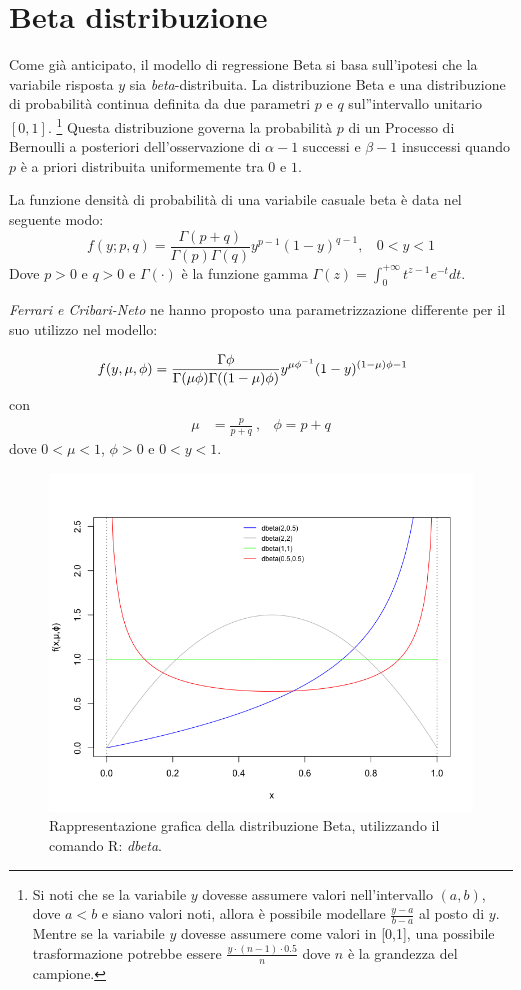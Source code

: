 \documentclass[twoside,twocolumn]{article}
\begin{document}
	\section{Beta distribuzione}
	Come già anticipato, il modello di regressione Beta si basa sull'ipotesi che la variabile risposta $y$ sia \textit{beta}-distribuita.
	La distribuzione Beta e una distribuzione di probabilità continua definita da due parametri $p$ e $q$ sul''intervallo unitario $[0,1]$. \footnote{Si noti che se la variabile $y$ dovesse assumere valori nell'intervallo $(a,b)$, dove $a < b$ e siano valori noti, allora è possibile modellare $\frac{y-a}{b-a}$ al posto di $y$. Mentre se la variabile $y$ dovesse assumere come valori in [0,1], una possibile trasformazione potrebbe essere $\frac{y\cdot (n-1) \cdot 0.5}{n}$ dove $n$ è la grandezza del campione.} Questa distribuzione governa la probabilità $p$ di un Processo di Bernoulli a posteriori dell'osservazione di $\alpha -1$ successi e $\beta -1$ insuccessi quando $p$  è a priori distribuita uniformemente tra $0$ e $1$. 
	
	La funzione densità di probabilità di una variabile casuale beta è data nel seguente modo:
	$$f(y;p,q)=\frac{\Gamma(p+q)}{\Gamma(p)\Gamma(q)}y^{p-1}(1-y)^{q-1},\ \ \ \ 0 <y<1$$ 
	Dove $p>0$ e $q>0$ e $\Gamma(\cdot)$ è la funzione gamma $\Gamma(z)=\int_{0}^{+ \infty} t^{z-1} e^{-t} dt.$ 
	
	\emph{Ferrari e Cribari-Neto} ne hanno proposto una parametrizzazione differente per il suo utilizzo nel modello:

	$$
		\hspace{-4mm}
	f(y,\mu,\phi)=\frac{\Gamma{\phi}}{\Gamma(\mu\phi)\Gamma((1-\mu)\phi)}y^{\mu\phi^{-1}}(1-y)^{(1-\mu)\phi-1} $$
	con 
	\begin{align*}
	\mu&=\frac{p}{p+q} \ , & \phi=p+q
	\end{align*}
	dove $0<\mu<1$, $\phi >0 $ e $0<y<1$. 
		\begin{figure}[h]
		\hspace*{-0.5cm}
		\includegraphics[scale=.3]{Beta}
		\caption{Rappresentazione grafica della distribuzione Beta, utilizzando il comando R: \emph{dbeta}.}
	\end{figure}
	
\end{document}

